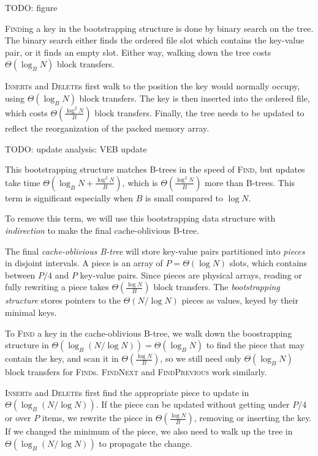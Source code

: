 TODO: figure

\textsc{Find}ing a key in the bootstrapping structure is done by binary search
on the tree. The binary search either finds the ordered file slot which contains
the key-value pair, or it finds an empty slot. Either way, walking down
the tree costs $\Theta(\log_B N)$ block transfers.

\textsc{Insert}s and \textsc{Delete}s first walk to the position the key
would normally occupy, using $\Theta(\log_B N)$ block transfers. The key
is then inserted into the ordered file, which costs
$\Theta(\frac{\log^2 N}{B})$ block transfers. Finally, the tree needs to be
updated to reflect the reorganization of the packed memory array.

TODO: update analysis: VEB update

This bootstrapping structure matches B-trees in the speed of \textsc{Find},
but updates take time $\Theta(\log_B N+\frac{\log^2 N}{B})$, which is
$\Theta(\frac{\log^2 N}{B})$ more than B-trees.
This term is significant especially when $B$ is small compared to $\log N$.

To remove this term, we will use this bootstrapping data structure with
\textit{indirection} to make the final cache-oblivious B-tree.

The final \textit{cache-oblivious B-tree} will store key-value pairs
partitioned into \textit{pieces} in disjoint intervals. A piece is an array of
$P=\Theta(\log N)$ slots, which contains between $P/4$ and $P$ key-value pairs.
Since pieces are physical arrays, reading or fully rewriting a piece
takes $\Theta(\frac{\log N}{B})$ block transfers.
The \textit{bootstrapping structure} stores pointers to the $\Theta(N/\log N)$
pieces as values, keyed by their minimal keys.

To \textsc{Find} a key in the cache-oblivious B-tree, we walk down the
boostrapping structure in $\Theta(\log_B (N/\log N))=\Theta(\log_B N)$
to find the piece that may contain the key, and scan it in
$\Theta(\frac{\log N}{B})$, so we still need only $\Theta(\log_B N)$
block transfers for \textsc{Find}s.
\textsc{FindNext} and \textsc{FindPrevious} work similarly.

\textsc{Insert}s and \textsc{Delete}s first find the appropriate piece
to update in $\Theta(\log_B (N/\log N))$. If the piece can be updated
without getting under $P/4$ or over $P$ items, we rewrite the piece in
$\Theta(\frac{\log N}{B})$, removing or inserting the key. If we changed
the minimum of the piece, we also need to walk up the tree in $\Theta(\log_B
(N/\log N))$ to propagate the change.

